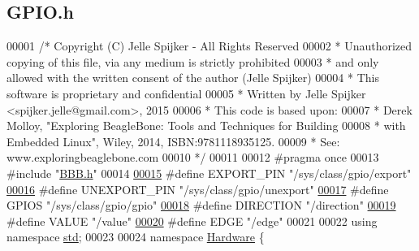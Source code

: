 \hypertarget{_g_p_i_o_8h_source}{}\subsection{G\+P\+I\+O.\+h}
\label{_g_p_i_o_8h_source}

\begin{DoxyCode}
00001 \textcolor{comment}{/* Copyright (C) Jelle Spijker - All Rights Reserved}
00002 \textcolor{comment}{ * Unauthorized copying of this file, via any medium is strictly prohibited}
00003 \textcolor{comment}{ * and only allowed with the written consent of the author (Jelle Spijker)}
00004 \textcolor{comment}{ * This software is proprietary and confidential}
00005 \textcolor{comment}{ * Written by Jelle Spijker <spijker.jelle@gmail.com>, 2015}
00006 \textcolor{comment}{ * This code is based upon:}
00007 \textcolor{comment}{ * Derek Molloy, "Exploring BeagleBone: Tools and Techniques for Building}
00008 \textcolor{comment}{ * with Embedded Linux", Wiley, 2014, ISBN:9781118935125.}
00009 \textcolor{comment}{ * See: www.exploringbeaglebone.com}
00010 \textcolor{comment}{ */}
00011 
00012 \textcolor{preprocessor}{#pragma once}
00013 \textcolor{preprocessor}{#include "\hyperlink{_b_b_b_8h}{BBB.h}"}
00014 
\hypertarget{_g_p_i_o_8h_source_l00015}{}\hyperlink{_g_p_i_o_8h_a76065c2ed428f7d0b15d2cd8e494b857}{00015} \textcolor{preprocessor}{#define EXPORT\_PIN "/sys/class/gpio/export"}
\hypertarget{_g_p_i_o_8h_source_l00016}{}\hyperlink{_g_p_i_o_8h_a57a9168261422a24cc4b062b0376449b}{00016} \textcolor{preprocessor}{#define UNEXPORT\_PIN "/sys/class/gpio/unexport"}
\hypertarget{_g_p_i_o_8h_source_l00017}{}\hyperlink{_g_p_i_o_8h_ad3c9654be00e07ca084884963ae36830}{00017} \textcolor{preprocessor}{#define GPIOS "/sys/class/gpio/gpio"}
\hypertarget{_g_p_i_o_8h_source_l00018}{}\hyperlink{_g_p_i_o_8h_a1d692daf1ffadae2243a5ab556589629}{00018} \textcolor{preprocessor}{#define DIRECTION "/direction"}
\hypertarget{_g_p_i_o_8h_source_l00019}{}\hyperlink{_g_p_i_o_8h_aa0b03826c8f7cc324ac2db0ada2dce0a}{00019} \textcolor{preprocessor}{#define VALUE "/value"}
\hypertarget{_g_p_i_o_8h_source_l00020}{}\hyperlink{_g_p_i_o_8h_ac243bfa96aa2c28014159ff098bd2324}{00020} \textcolor{preprocessor}{#define EDGE "/edge"}
00021 
00022 \textcolor{keyword}{using namespace }\hyperlink{namespacestd}{std};
00023 
00024 \textcolor{keyword}{namespace }\hyperlink{namespace_hardware}{Hardware} \{

\end{DoxyCode}
